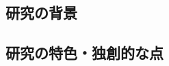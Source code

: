 \documentclass[11pt,a4paper,twoside,dvipdfmx]{jarticle}		%
\newcommand{\研究課題名}{粒子加速器を用いた電弱相互作用を持つ新物理の探索}
\newcommand{\研究機関名}{東京大学}
\newcommand{\申請者氏名}{千草颯}
\newcommand{\研究代表者氏名}{\申請者氏名}
\newcommand{\研究期間の最終元号年度}{34}	%
\begin{document}
\subsection{研究の背景}
\newcommand{\研究の背景}{%

\vspace*{1mm}

\fcolorbox{black}{my_gray}{これからの研究計画の背景}

\vspace*{1mm}

\vspace*{1mm}

\fcolorbox{black}{my_gray}{問題点と解決すべき点、着想に至った経緯等}

\vspace*{1mm}



}

\subsection{研究の特色・独創的な点}
\newcommand{\研究の特色と独創的な点}{%

\vspace*{1mm}

\fcolorbox{black}{my_gray}{特色、独創的な点}

\vspace*{1mm}

\vspace*{1mm}

\fcolorbox{black}{my_gray}{位置付け、意義}

\vspace*{1mm}


\fcolorbox{black}{my_gray}{インパクトおよび将来の見通し}

}
\end{document}
